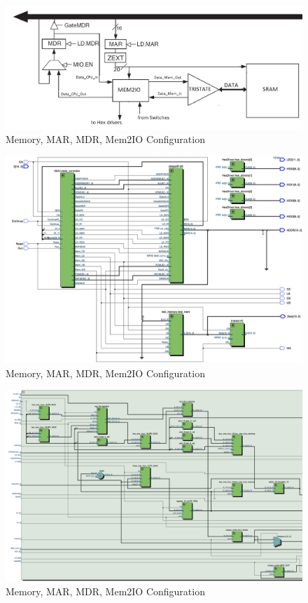 \documentclass[journal, twocolumn, final,11pt,letterpaper]{IEEEtran}
\begin{document}
\begin{figure} [htbp]
	\centering
	\includegraphics[scale=0.4]{Memory_Circuit.png}
	\caption{Memory, MAR, MDR, Mem2IO Configuration\label{fig:Memory-Circuit}}
\end{figure}

\begin{figure} [htbp]
	\centering
	\includegraphics[scale=0.4]{slc3_top_level_circuit.png}
	\caption{Memory, MAR, MDR, Mem2IO Configuration\label{fig:slc3-circuit}}
\end{figure}

\begin{figure} [htbp]
	\centering
	\includegraphics[scale=0.4]{datapath_input_circuit.png}
	\caption{Memory, MAR, MDR, Mem2IO Configuration\label{fig:datapath-circuit-input}}
\end{figure}
\end{document}
